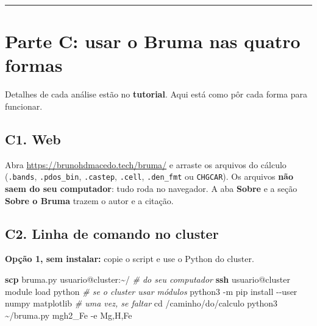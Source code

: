 \documentclass[
  10pt,
]{article}
\newenvironment{Shaded}{\begin{snugshade}}{\end{snugshade}}
\newcommand{\AttributeTok}[1]{\textcolor[rgb]{0.13,0.29,0.53}{#1}}
\newcommand{\BuiltInTok}[1]{#1}
\newcommand{\CommentTok}[1]{\textcolor[rgb]{0.56,0.35,0.01}{\textit{#1}}}
\newcommand{\ExtensionTok}[1]{#1}
\newcommand{\FunctionTok}[1]{\textcolor[rgb]{0.13,0.29,0.53}{\textbf{#1}}}
\newcommand{\NormalTok}[1]{#1}
\begin{document}
\begin{center}\rule{0.5\linewidth}{0.5pt}\end{center}

\hypertarget{parte-c-usar-o-bruma-nas-quatro-formas}{%
\section{Parte C: usar o Bruma nas quatro
formas}\label{parte-c-usar-o-bruma-nas-quatro-formas}}

Detalhes de cada análise estão no \textbf{tutorial}. Aqui está como pôr
cada forma para funcionar.

\hypertarget{c1.-web}{%
\subsection{C1. Web}\label{c1.-web}}

Abra \url{https://brunohdmacedo.tech/bruma/} e arraste os arquivos do
cálculo (\texttt{.\allowbreak{}bands},
\texttt{.\allowbreak{}pdos\_\allowbreak{}bin},
\texttt{.\allowbreak{}castep}, \texttt{.\allowbreak{}cell},
\texttt{.\allowbreak{}den\_\allowbreak{}fmt} ou \texttt{CHGCAR}). Os
arquivos \textbf{não saem do seu computador}: tudo roda no navegador. A
aba \textbf{Sobre} e a seção \textbf{Sobre o Bruma} trazem o autor e a
citação.

\hypertarget{c2.-linha-de-comando-no-cluster}{%
\subsection{C2. Linha de comando no
cluster}\label{c2.-linha-de-comando-no-cluster}}

\textbf{Opção 1, sem instalar:} copie o script e use o Python do
cluster.

\begin{Shaded}
\begin{Highlighting}[]
\FunctionTok{scp}\NormalTok{ bruma.py usuario@cluster:\textasciitilde{}/                  }\CommentTok{\# do seu computador}
\FunctionTok{ssh}\NormalTok{ usuario@cluster}
\ExtensionTok{module}\NormalTok{ load python                               }\CommentTok{\# se o cluster usar módulos}
\ExtensionTok{python3} \AttributeTok{{-}m}\NormalTok{ pip install }\AttributeTok{{-}{-}user}\NormalTok{ numpy matplotlib   }\CommentTok{\# uma vez, se faltar}
\BuiltInTok{cd}\NormalTok{ /caminho/do/calculo}
\ExtensionTok{python3}\NormalTok{ \textasciitilde{}/bruma.py mgh2\_Fe }\AttributeTok{{-}e}\NormalTok{ Mg,H,Fe}
\end{Highlighting}
\end{Shaded}
\end{document}
